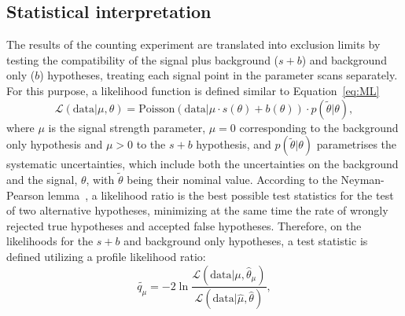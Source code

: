 \subsection{Statistical interpretation}
The results of the counting experiment are translated into exclusion limits by testing the compatibility of the signal plus background ($s+b$) and background only ($b$) hypotheses, treating each signal point in the parameter scans separately. For this purpose, a likelihood function is defined similar to Equation~\ref{eq:ML}~\cite{HiggsTool1}
\begin{equation}
\label{eq:like}
\mathcal{L}(\text{data}|\mu,\theta) = \text{Poisson}\left(\text{data}|\mu\cdot s\left(\theta\right) + b\left(\theta\right)\right)\cdot p\left(\tilde{\theta}|\theta\right),
\end{equation}
where $\mu$ is the signal strength parameter, $\mu = 0$ corresponding to the background only hypothesis and $\mu > 0$ to the  $s+b$ hypothesis, and $p(\tilde{\theta}|\theta)$ parametrises the systematic uncertainties, which include both the uncertainties on the background and the signal, $\theta$, with $\tilde{\theta}$ being their nominal value. According to the Neyman-Pearson lemma~\cite{NeymanPearson}, a likelihood ratio is the best possible test statistics for the test of two alternative hypotheses, minimizing at the same time the rate of wrongly rejected true hypotheses and accepted false hypotheses. Therefore, on the likelihoods for the $s+b$ and background only hypotheses, a test statistic is defined utilizing a profile likelihood ratio: 
\begin{equation*}
\tilde{q_{\mu}} = -2 \ln\frac{\mathcal{L}\left(\text{data}|\mu,\hat{\theta}_\mu\right)}{\mathcal{L}\left(\text{data}|\hat{\mu},\hat{\theta}\right)},
\end{equation*}
